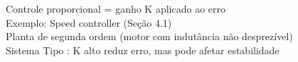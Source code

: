 \documentclass[preview]{standalone}
\begin{document}
Controle proporcional = ganho K aplicado ao erro\\Exemplo: Speed controller (Seção 4.1)\\Planta de segunda ordem (motor com indutância não desprezível)\\Sistema Tipo : K alto reduz erro, mas pode afetar estabilidade\\
\end{document}
